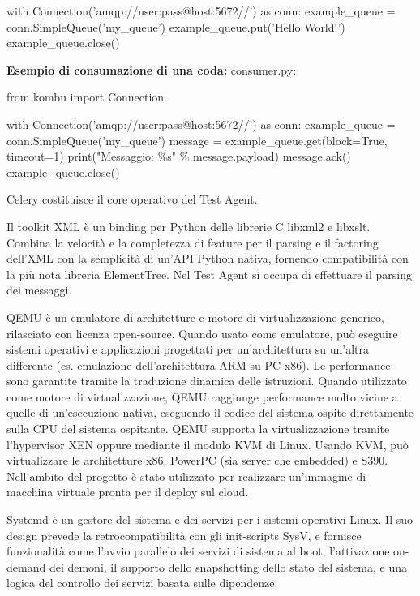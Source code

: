 \begin{description}[nolistsep]
\begin{itemize}[nolistsep]
\begin{python}
with Connection('amqp://user:pass@host:5672//') as conn:
    example_queue = conn.SimpleQueue('my_queue')
    example_queue.put('Hello World!')
    example_queue.close()
\end{python}


\textbf{Esempio di consumazione di una coda:}
consumer.py:
\begin{python}
from kombu import Connection

with Connection('amqp://user:pass@host:5672//') as conn:
    example_queue = conn.SimpleQueue('my_queue')
    message = example_queue.get(block=True, timeout=1)
    print("Messaggio: \%s" \% message.payload)
    message.ack()
    example_queue.close()
\end{python}
\end{itemize}
Celery costituisce il core operativo del Test Agent.
\item[lxml Toolkit]Il toolkit XML è un binding per Python delle librerie C libxml2 e libxslt. Combina la velocità e la completezza di feature per il parsing e il factoring dell'XML con la semplicità di un'API Python nativa, fornendo compatibilità con la più nota libreria ElementTree.
\newline
Nel Test Agent si occupa di effettuare il parsing dei messaggi.
\item[QEMU]QEMU è un emulatore di architetture e motore di virtualizzazione generico, rilasciato con licenza open-source. Quando usato come emulatore, può eseguire sistemi operativi e applicazioni progettati per un'architettura su un'altra differente (es. emulazione dell'architettura ARM su PC x86). Le performance sono garantite tramite la traduzione dinamica delle istruzioni.
Quando utilizzato come motore di virtualizzazione, QEMU raggiunge performance molto vicine a quelle di un'esecuzione nativa, eseguendo il codice del sistema ospite direttamente sulla CPU del sistema ospitante. QEMU supporta la virtualizzazione tramite l'hypervisor XEN oppure mediante il modulo KVM di Linux. Usando KVM, può virtualizzare le architetture x86, PowerPC (sia server che embedded) e S390.
\newline
Nell'ambito del progetto è stato utilizzato per realizzare un'immagine di macchina virtuale pronta per il deploy sul cloud.
\item[Systemd]
Systemd è un gestore del sistema e dei servizi per i sistemi operativi Linux. Il suo design prevede la retrocompatibilità con gli init-scripts SysV, e fornisce funzionalità come l'avvio parallelo dei servizi di sistema al boot, l'attivazione on-demand dei demoni, il supporto dello snapshotting dello stato del sistema, e una logica del controllo dei servizi basata sulle dipendenze.

\end{description}

